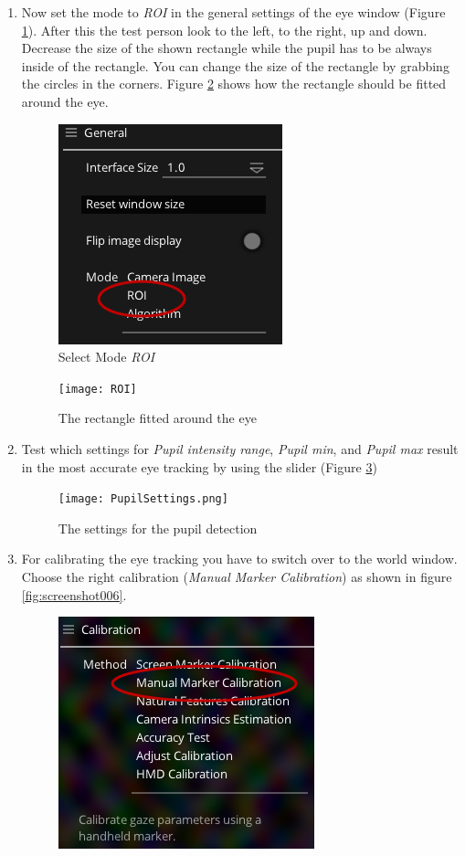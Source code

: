 \documentclass[../../Instruction_PupilCapture]{subfiles}
\begin{document}
\begin{enumerate}
	\item Now set the mode to \textit{ROI} in the general settings of the eye window (Figure \ref{fig:screenshot005}). After this the test person look to the left, to the right, up and down. Decrease the size of the  shown rectangle while the pupil has to be always inside of the rectangle. You can change the size of the rectangle by grabbing the circles in the corners. Figure \ref{roi} shows how the rectangle should be fitted around the eye.
	\begin{figure}[h!]
		\centering
		\includegraphics[width=0.5\linewidth]{img/screenshot005}
		\caption{Select Mode \textit{ROI}}
		\label{fig:screenshot005}
	\end{figure}
	\begin{figure}[h!]
		\centering
		\texttt{[image: ROI]}
		\caption{The rectangle fitted around the eye}
		\label{roi}
	\end{figure}\clearpage
	\item Test which settings for \textit{Pupil intensity range}, \textit{Pupil min}, and \textit{Pupil max} result in the most accurate eye tracking by using the slider (Figure \ref{PupilSettings})  		
	\begin{figure}[h!]
		\centering
		\texttt{[image: PupilSettings.png]}
		\caption{The settings for the pupil detection}
		\label{PupilSettings}
	\end{figure}
	\item For calibrating the eye tracking you have to switch over to the world window. Choose the right calibration (\textit{Manual Marker Calibration}) as shown in figure \ref{fig:screenshot006}.
	\begin{figure}[h!]
		\centering
		\includegraphics[width=0.5\linewidth]{img/screenshot006}

\end{figure}
\end{enumerate}
\end{document}

